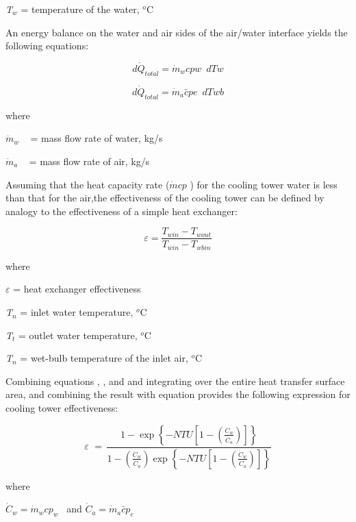\emph{T\(_{w}\)} = temperature of the water, \(^{o}\)C

An energy balance on the water and air sides of the air/water interface yields the following equations:

\begin{equation}
d{\dot Q_{total}} = {\dot m_w}cpw\,\,\,dTw
\end{equation}

\begin{equation}
d{\dot Q_{total}} = {\dot m_a}\bar cpe\,\,\,dTwb
\end{equation}

where

\({\dot m_w}\) ~ = mass flow rate of water, kg/s

\({\dot m_a}\) ~ = mass flow rate of air, kg/s

Assuming that the heat capacity rate (\(\dot mcp\) ) for the cooling tower water is less than that for the air,the effectiveness of the cooling tower can be defined by analogy to the effectiveness of a simple heat exchanger:

\begin{equation}
\varepsilon  = \frac{{{T_{win}} - {T_{wout}}}}{{{T_{win}} - {T_{wbin}}}}
\end{equation}

where

\emph{$\varepsilon$} = heat exchanger effectiveness

\emph{T\(_{n}\)} = inlet water temperature, \(^{o}\)C

\emph{T\(_{t}\)} = outlet water temperature, \(^{o}\)C

\emph{T\(_{n}\)} = wet-bulb temperature of the inlet air, \(^{o}\)C

Combining equations , , and and integrating over the entire heat transfer surface area, and combining the result with equation provides the following expression for cooling tower effectiveness:

\begin{equation}
\varepsilon \,\, = \,\frac{{1 - \exp \left\{ { - NTU\left[ {1 - \left( {\frac{{{{\dot C}_w}}}{{{{\dot C}_a}}}} \right)} \right]} \right\}}}{{1 - \left( {\frac{{{{\dot C}_w}}}{{{{\dot C}_a}}}} \right)\exp \left\{ { - NTU\left[ {1 - \left( {\frac{{{{\dot C}_w}}}{{{{\dot C}_a}}}} \right)} \right]} \right\}}}
\end{equation}

where

\({\dot C_w} = {\dot m_w}c{p_w}\) ~and \({\dot C_a} = {\dot m_a}\bar c{p_e}\)

